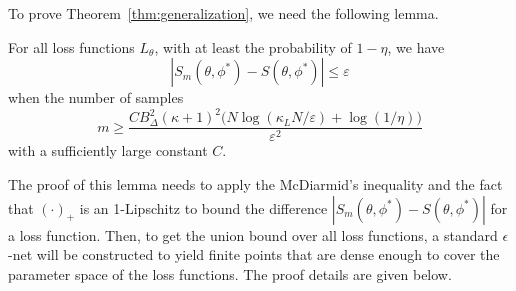 To prove Theorem~\ref{thm:generalization}, we need the following lemma.
\begin{lemma}
For all loss functions $L_\theta$, with at least the probability of $1-\eta$, we have
$$
|S_m(\theta,\phi^*)-S(\theta,\phi^*)|\leq \varepsilon
$$
when the number of samples $$
m\geq\dfrac{C B_\Delta^2(\kappa+1)^2 \big(N \log(\kappa_L N/\varepsilon)+\log(1/\eta)\big)}{\varepsilon^2}$$
with a sufficiently large constant $C$.
\end{lemma}
The proof of this lemma needs to apply the McDiarmid's inequality and the fact that $(\cdot)_+$ is an 1-Lipschitz
to bound the difference $|S_m(\theta,\phi^*)-S(\theta,\phi^*)|$ for a loss function.  Then, to get the union bound over all loss functions, a standard $\epsilon$-net \cite{arora2017generalization} will be constructed to yield finite points that are dense enough to cover the parameter space of the loss functions. The proof details are given below.
